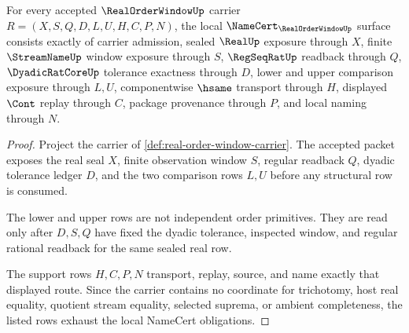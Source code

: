 \begin{theorem}
\label{thm:real-order-window-namecert-obligations}
For every accepted $\RealOrderWindowUp$ carrier $R=(X,S,Q,D,L,U,H,C,P,N)$, the local $\NameCert_{\RealOrderWindowUp}$ surface consists exactly of carrier admission, sealed $\RealUp$ exposure through $X$, finite $\StreamNameUp$ window exposure through $S$, $\RegSeqRatUp$ readback through $Q$, $\DyadicRatCoreUp$ tolerance exactness through $D$, lower and upper comparison exposure through $L,U$, componentwise $\hsame$ transport through $H$, displayed $\Cont$ replay through $C$, package provenance through $P$, and local naming through $N$.
\end{theorem}
\begin{proof}
Project the carrier of \autoref{def:real-order-window-carrier}. The accepted packet exposes the real seal $X$, finite observation window $S$, regular readback $Q$, dyadic tolerance ledger $D$, and the two comparison rows $L,U$ before any structural row is consumed.

The lower and upper rows are not independent order primitives. They are read only after $D,S,Q$ have fixed the dyadic tolerance, inspected window, and regular rational readback for the same sealed real row.

The support rows $H,C,P,N$ transport, replay, source, and name exactly that displayed route. Since the carrier contains no coordinate for trichotomy, host real equality, quotient stream equality, selected suprema, or ambient completeness, the listed rows exhaust the local NameCert obligations.
\end{proof}

